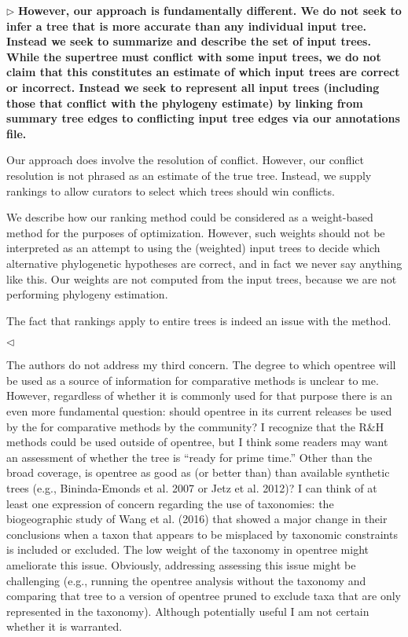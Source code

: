 \documentclass{article}
\newenvironment{reply}{$\triangleright$\bf}{$\triangleleft$}
\begin{document}
\begin{reply}
However, our approach is fundamentally different.  We do not seek to infer a tree that is more accurate than any individual input tree.  Instead we seek to summarize and describe the set of input trees.  While the supertree must conflict with some input trees, we do not claim that this constitutes an estimate of which input trees are correct or incorrect.  Instead we seek to represent all input trees (including those that conflict with the phylogeny estimate) by linking from summary tree edges to conflicting input tree edges via our annotations file.

Our approach does involve the resolution of conflict.  However, our conflict resolution is not phrased as an estimate of the true tree.  Instead, we supply rankings to allow curators to select which trees should win conflicts.

We describe how our ranking method could be considered as a weight-based method for the purposes of optimization.  However, such weights should not be interpreted as an attempt to using the (weighted) input trees to decide which alternative phylogenetic hypotheses are correct, and in fact we never say anything like this. Our weights are not computed from the input trees, because we are not performing phylogeny estimation.  

The fact that rankings apply to entire trees is indeed an issue with the method.


\end{reply}

The authors do not address my third concern. The degree to which opentree will be used as a source of information for comparative methods is unclear to me. However, regardless of whether it is commonly used for that purpose there is an even more fundamental question: should opentree in its current releases be used by the for comparative methods by the community? I recognize that the R\&H methods could be used outside of opentree, but I think some readers may want an assessment of whether the tree is “ready for prime time.” Other than the broad coverage, is opentree as good as (or better than) than available synthetic trees (e.g., Bininda-Emonds et al. 2007 or Jetz et al. 2012)? I can think of at least one expression of concern regarding the use of taxonomies: the biogeographic study of Wang et al. (2016) that showed a major change in their conclusions when a taxon that appears to be misplaced by taxonomic constraints is included or excluded. The low weight of the taxonomy in opentree might ameliorate this issue. Obviously, addressing assessing this issue might be challenging (e.g., running the opentree analysis without the taxonomy and comparing that tree to a version of opentree pruned to exclude taxa that are only represented in the taxonomy). Although potentially useful I am not certain whether it is warranted.
\end{document}
